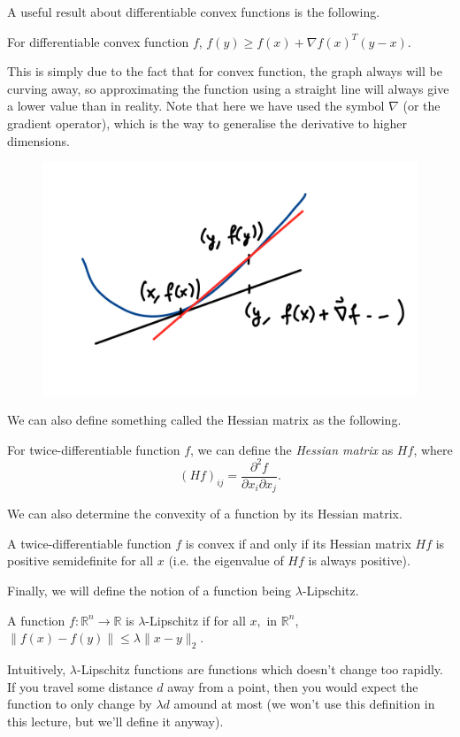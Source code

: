 \documentclass[12pt]{article}
\newcommand{\real}{\mathbb{R}}
\begin{document}
A useful result about differentiable convex functions is the following.
\begin{fact}
	For differentiable convex function $f$, $f(y) \geq f(x) + \nabla f(x)^T (y-x)$. 
\end{fact}
This is simply due to the fact that for convex function, the graph always will be curving away, so approximating the function using a straight line will always give a lower value than in reality. Note that here we have used the symbol $\nabla$ (or the gradient operator), which is the way to generalise the derivative to higher dimensions. 

\begin{figure}[H]
	\centering
	\includegraphics[width=0.4\linewidth]{img3}
\end{figure}

We can also define something called the Hessian matrix as the following.
\begin{definition}
	For twice-differentiable function $f$, we can define the \textit{Hessian matrix} as $Hf$, where $$(Hf)_{ij} = \frac{\partial^2f}{\partial x_i \partial x_j}.$$ 
\end{definition}
We can also determine the convexity of a function by its Hessian matrix.
\begin{fact}
	A twice-differentiable function $f$ is convex if and only if its Hessian matrix $Hf$ is positive semidefinite for all $x$ (i.e. the eigenvalue of $Hf$ is always positive).
\end{fact}

Finally, we will define the notion of a function being $\lambda$-Lipschitz.
\begin{definition}
	A function $f: \real^n \to \real$ is $\lambda$-Lipschitz if for all $x, $ in $\real^n$, $\|f(x) - f(y) \| \leq \lambda \|x-y\|_2$. 
\end{definition}
Intuitively, $\lambda$-Lipschitz functions are functions which doesn't change too rapidly. If you travel some distance $d$ away from a point, then you would expect the function to only change by $\lambda d$ amound at most (we won't use this definition in this lecture, but we'll define it anyway).
\end{document}

